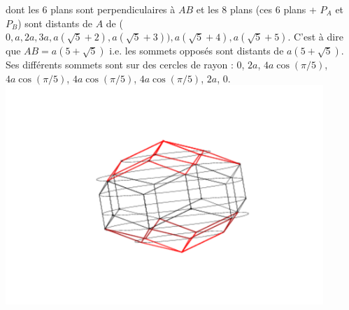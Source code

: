 \documentclass[a4paper,11pt]{book}
\begin{document}
dont les 6 plans sont perpendiculaires \`a $AB$ et les 8 plans (ces 6 plans + $P_A$ et $P_B$) sont distants 
de $A$ de ($0,a,2a,3a,a(\sqrt 5+2),a(\sqrt 5+3)),a(\sqrt 5+4),a(\sqrt 5+5)$. 
C'est \`a dire que $AB=a(5+\sqrt 5)$ i.e. les sommets oppos\'es sont distants
de $a(5+\sqrt 5)$.\\
Ses diff\'erents sommets sont sur des cercles de rayon : 
0, $2a$, $4a\cos(\pi/5)$, $4a\cos(\pi/5)$, $4a\cos(\pi/5)$, $4a\cos(\pi/5)$, $2a$, 0.\\ 
\includegraphics[width=12cm]{triacon6}\\
\end{document}
